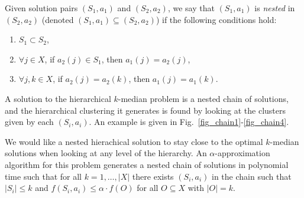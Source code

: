 \documentclass[conference, 10pt, final]{IEEEtran}
\begin{document}
Given solution pairs $(S_1, a_1)$ and $(S_2, a_2)$, we say that $(S_1, a_1)$ is \emph{nested} in $(S_2, a_2)$ (denoted $(S_1, a_1) \subseteq (S_2, a_2)$) if the following conditions hold:
\begin{enumerate}[\IEEEsetlabelwidth{3)}]
	\item $S_1 \subset S_2$, 
	\item $\forall  j \in X$, if $a_2(j) \in S_1$, then $a_1(j) = a_2(j)$, 
	\item $\forall j, k \in X$, if $a_2(j) = a_2(k)$, then $a_1(j) = a_1(k)$.
\end{enumerate}
A solution to the hierarchical $k$-median problem is a nested chain of solutions, and the hierarchical clustering it generates is found by looking at the clusters given by each $(S_i, a_i)$. An example is given in Fig.~\ref{fig_chain1}-\ref{fig_chain4}. 

We would like a nested hierachical solution to stay close to the optimal $k$-median solutions when looking at any level of the hierarchy. An $\alpha$-approximation algorithm for this problem generates a nested chain of solutions in polynomial time such that for all $k = 1, \ldots, |X|$ there exists $(S_i, a_i)$ in the chain such that $|S_i| \leq k$ and $f(S_i, a_i) \leq \alpha \cdot f(O)$ for all $O \subseteq X$ with $|O| = k$.
\end{document}
